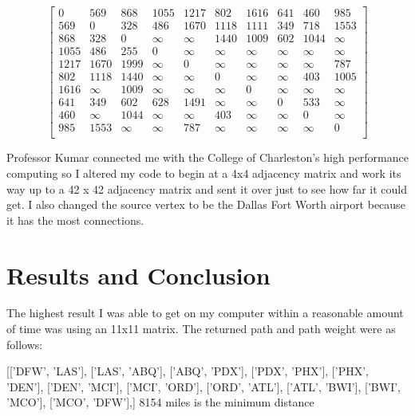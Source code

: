 \documentclass[12pt]{article}
\begin{document}
\[
\quad
\begin{bmatrix}
       0 & 569 & 868 & 1055 & 1217 & 802 & 1616 & 641 & 460 & 985 \\
       569 & 0 & 328 & 486 & 1670 & 1118 & 1111 & 349 & 718 & 1553 \\
       868 & 328 & 0 & \infty & \infty & 1440 & 1009 & 602 & 1044 & \infty \\
       1055 & 486 & 255 & 0 & \infty & \infty & \infty & \infty & \infty & \infty \\
       1217 & 1670 & 1999 & \infty & 0 & \infty & \infty & \infty & \infty & 787 \\
       802 & 1118 & 1440 & \infty & \infty & 0 & \infty & \infty & 403 & 1005 \\
       1616 & \infty & 1009 & \infty & \infty & \infty & 0 & \infty & \infty & \infty \\
       641 & 349 & 602 & 628 & 1491 & \infty & \infty & 0 & 533 & \infty \\
       460 & \infty & 1044 & \infty & \infty & 403 & \infty & \infty & 0 & \infty \\
       985 & 1553 & \infty & \infty & 787 & \infty & \infty & \infty & \infty & 0 \\
\end{bmatrix}
\quad
\]

Professor Kumar connected me with the College of
Charleston's high performance computing so I altered my code to begin at a 
4x4 adjacency matrix and work its way up to a 42 x 42 adjacency matrix and sent 
it over just to see how far it could get. I also changed the source vertex to
be the Dallas Fort Worth airport because it has the most connections.

\section*{Results and Conclusion} 

The highest result I was able to get on my computer within a reasonable amount
of time was using an 11x11 matrix. The returned path and path weight were as
follows:

\begin{center}
[['DFW', 'LAS'], ['LAS', 'ABQ'], ['ABQ', 'PDX'], ['PDX', 'PHX'],
 ['PHX', 'DEN'], ['DEN', 'MCI'], ['MCI', 'ORD'], ['ORD', 'ATL'], 
 ['ATL', 'BWI'], ['BWI', 'MCO'], ['MCO', 'DFW'],] 8154 miles is the minimum distance
\end{center}
\end{document}
